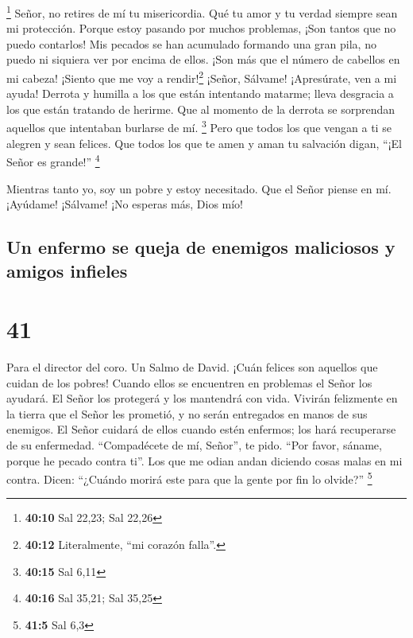 \footnote{\textbf{40:10} Sal 22,23; Sal 22,26}  Señor, no
retires de mí tu misericordia. Qué tu amor y tu verdad siempre sean mi
protección.  Porque estoy pasando por muchos problemas,
¡Son tantos que no puedo contarlos! Mis pecados se han acumulado
formando una gran pila, no puedo ni siquiera ver por encima de ellos.
¡Son más que el número de cabellos en mi cabeza! ¡Siento que me voy a
rendir!\footnote{\textbf{40:12} Literalmente, ``mi corazón falla''.}
 ¡Señor, Sálvame! ¡Apresúrate, ven a mi ayuda!
 Derrota y humilla a los que están intentando matarme;
lleva desgracia a los que están tratando de herirme.  Que
al momento de la derrota se sorprendan aquellos que intentaban burlarse
de mí. \footnote{\textbf{40:15} Sal 6,11}  Pero que todos
los que vengan a ti se alegren y sean felices. Que todos los que te amen
y aman tu salvación digan, ``¡El Señor es grande!'' \footnote{\textbf{40:16}
  Sal 35,21; Sal 35,25}

 Mientras tanto yo, soy un pobre y estoy necesitado. Que
el Señor piense en mí. ¡Ayúdame! ¡Sálvame! ¡No esperas más, Dios mío!

\hypertarget{un-enfermo-se-queja-de-enemigos-maliciosos-y-amigos-infieles}{%
\subsection{Un enfermo se queja de enemigos maliciosos y amigos
infieles}\label{un-enfermo-se-queja-de-enemigos-maliciosos-y-amigos-infieles}}

\hypertarget{section-40}{%
\section{41}\label{section-40}}

Para el director del coro. Un Salmo de David.  ¡Cuán
felices son aquellos que cuidan de los pobres! Cuando ellos se
encuentren en problemas el Señor los ayudará.  El Señor
los protegerá y los mantendrá con vida. Vivirán felizmente en la tierra
que el Señor les prometió, y no serán entregados en manos de sus
enemigos.  El Señor cuidará de ellos cuando estén
enfermos; los hará recuperarse de su enfermedad. 
``Compadécete de mí, Señor'', te pido. ``Por favor, sáname, porque he
pecado contra ti''.  Los que me odian andan diciendo cosas
malas en mi contra. Dicen: ``¿Cuándo morirá este para que la gente por
fin lo olvide?'' \footnote{\textbf{41:5} Sal 6,3}

